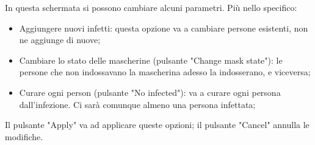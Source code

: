 \documentclass[a4paper,12pt]{report}
\begin{document}
In questa schermata si possono cambiare alcuni parametri. Più nello specifico:
\begin{itemize}
\item Aggiungere nuovi infetti: questa opzione va a cambiare persone esistenti, non ne aggiunge di nuove;
\item Cambiare lo stato delle mascherine (pulsante "Change mask state"): le persone che non indossavano la mascherina adesso la indosserano, e viceversa;
\item Curare ogni person (pulsante "No infected"): va a curare ogni persona dall'infezione. Ci sarà comunque almeno una persona infettata;
\end{itemize}

Il pulsante "Apply" va ad applicare queste opzioni; il pulsante "Cancel" annulla le modifiche.
\end{document}
